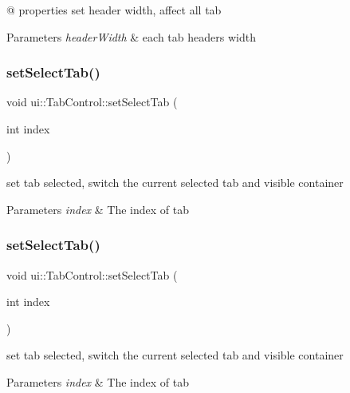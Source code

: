 @ properties set header width, affect all tab 
\begin{DoxyParams}{Parameters}
{\em header\+Width} & each tab header\textquotesingle{}s width \\
\hline
\end{DoxyParams}
\mbox{\label{classui_1_1TabControl_a1ac499ffee1045aabfb885b0ed873174}} 
\subsubsection{\texorpdfstring{set\+Select\+Tab()}{setSelectTab()}\hspace{0.1cm}{\footnotesize\ttfamily [1/4]}}
{\footnotesize\ttfamily void ui\+::\+Tab\+Control\+::set\+Select\+Tab (\begin{DoxyParamCaption}\item[{int}]{index }\end{DoxyParamCaption})}

set tab selected, switch the current selected tab and visible container 
\begin{DoxyParams}{Parameters}
{\em index} & The index of tab \\
\hline
\end{DoxyParams}
\mbox{\label{classui_1_1TabControl_a1ac499ffee1045aabfb885b0ed873174}} 
\subsubsection{\texorpdfstring{set\+Select\+Tab()}{setSelectTab()}\hspace{0.1cm}{\footnotesize\ttfamily [2/4]}}
{\footnotesize\ttfamily void ui\+::\+Tab\+Control\+::set\+Select\+Tab (\begin{DoxyParamCaption}\item[{int}]{index }\end{DoxyParamCaption})}

set tab selected, switch the current selected tab and visible container 
\begin{DoxyParams}{Parameters}
{\em index} & The index of tab \\
\hline
\end{DoxyParams}
\mbox{\label{classui_1_1TabControl_a4312f6e1d6c73d858fc662443b623e93}} 

